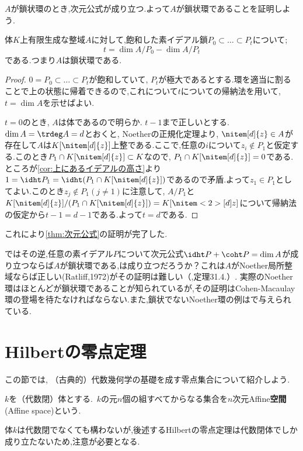$A$が鎖状環のとき,次元公式が成り立つ.よって$A$が鎖状環であることを証明しよう.

\begin{thm}
	体$K$上有限生成な整域$A$に対して,飽和した素イデアル鎖$P_0\subset\dots\subset P_t$について;
	\[t=\dim A/P_0-\dim A/P_t\]
	である.つまり$A$は鎖状環である.
\end{thm}

\begin{proof}
		$0=P_0\subset\dots\subset P_t$が飽和していて, $P_t$が極大であるとする.環を適当に割ることで上の状態に帰着できるので,これについて$t$についての帰納法を用いて, $t=\dim A$を示せばよい.
		
		$t=0$のとき, $A$は体であるので明らか. $t-1$まで正しいとする. $\dim A=\trdeg A=d$とおくと, Noetherの正規化定理より, $\nitem[d]{z}\in A$が存在して$A$は$K[\nitem[d]{z}]$上整である.ここで,任意の$i$について$z_i\not\in P_1$と仮定する.このとき$P_1\cap K[\nitem[d]{z}]\subset K$なので, $P_1\cap K[\nitem[d]{z}]=0$である.ところが\ref{cor:上にあるイデアルの高さ}より$1=\idht P_1=\idht (P_1\cap K[\nitem[d]{z}])$であるので矛盾.よって$z_1\in P_1$としてよい.このとき$z_j\not\in P_1 (j\neq1)$に注意して, $A/P_1$と$K[\nitem[d]{z}]/(P_1\cap K[\nitem[d]{z}])=K[\nitem<2>[d]{z}]$について帰納法の仮定から$t-1=d-1$である.よって$t=d$である.
\end{proof}

これにより\ref{thm:次元公式}の証明が完了した.

ではその逆,任意の素イデアル$P$について次元公式$\idht P +\coht P =\dim A$が成り立つならば$A$が鎖状環である,は成り立つだろうか？これは$A$がNoether局所整域ならば正しい(Ratliff,1972)がその証明は難しい（\cite{matsu},定理31.4.）. 実際のNoether環はほとんどが鎖状環であることが知られているが,その証明はCohen-Macaulay環の登場を待たなければならない.また,鎖状でないNoether環の例は\cite{Nag73}で与えられている.
\section{Hilbertの零点定理}

この節では, （古典的）代数幾何学の基礎を成す零点集合について紹介しよう.
	
\begin{defi}[Affine-$n$空間]
	$k$を（代数閉）体とする.~$k$の元$n$個の組すべてからなる集合を$n$次元Affine\textbf{空間}(Affine space)という.
\end{defi}

体$k$は代数閉でなくても構わないが,後述するHilbertの零点定理は代数閉体でしか成り立たないため,注意が必要となる.

